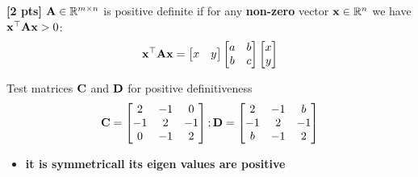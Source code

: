\documentclass[11pt,addpoints,answers]{exam}
\numberwithin{equation}{section} %
\numberwithin{figure}{section} %
\numberwithin{table}{section} %
\begin{document}
\begin{questions}
\begin{tcolorbox}[fit,height=5cm, width=\textwidth, blank, borderline={0.5pt}{-2pt},halign=center, valign=center, nobeforeafter]
    
    \end{tcolorbox}

    \question \textbf{[2 pts]}  $\mathbf{A} \in \mathbb{R}^{m \times n}$ is positive definite if for any \textbf{non-zero} vector $\mathbf{x} \in \mathbb{R}^{n}$  we have $\mathbf{x}^\top \mathbf{A} \mathbf{x} > 0$:
    \begin{align*}
        \mathbf{x}^\top \mathbf{A} \mathbf{x} = \begin{bmatrix}
            x & y
        \end{bmatrix} \begin{bmatrix}
            a & b \\ b & c
        \end{bmatrix}
        \begin{bmatrix}
            x \\ y
        \end{bmatrix}
    \end{align*}

    Test matrices $\mathbf{C}$ and $\mathbf{D}$ for positive definitiveness
    \begin{align*}
        \mathbf{C}=\begin{bmatrix}
                 2 & -1 & 0 \\
                 -1 & 2 & -1 \\
                 0 & -1 & 2
                \end{bmatrix};
        \mathbf{D}=\begin{bmatrix}
                 2 & -1 & b \\
                 -1 & 2 & -1 \\
                 b & -1 & 2
                \end{bmatrix}
    \end{align*}
    \begin{tcolorbox}[fit,height=12cm, width=\textwidth, blank, borderline={0.5pt}{-2pt},halign=center, valign=center, nobeforeafter]
    
    \begin{flushleft}\begin{itemize} \item {}\textbf{it is symmetric}\textbf{all its eigen values are positive}\end{itemize}   \end{flushleft}\\
    
    

\end{tcolorbox}
\end{questions}
\end{document}
